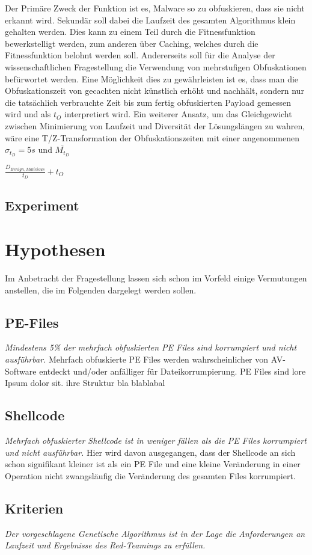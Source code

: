 Der Primäre Zweck der Funktion ist es, Malware so zu obfuskieren, dass sie nicht erkannt wird. Sekundär soll dabei die Laufzeit des gesamten Algorithmus klein gehalten werden. Dies kann zu einem Teil durch die Fitnessfunktion bewerkstelligt werden, zum anderen über Caching, welches durch die Fitnessfunktion belohnt werden soll. Andererseits soll für die Analyse der wissenschaftlichen Fragestellung die Verwendung von mehrstufigen Obfuskationen befürwortet werden. Eine Möglichkeit dies zu gewährleisten ist es, dass man die Obfuskationszeit von gecachten nicht künstlich erhöht und nachhält, sondern nur die tatsächlich verbrauchte Zeit bis zum fertig obfuskierten Payload gemessen wird und als $t_O$ interpretiert wird.
Ein weiterer Ansatz, um das Gleichgewicht zwischen Minimierung von Laufzeit und Diversität der Lösungslängen zu wahren, wäre eine T/Z-Transformation der Obfuskationszeiten mit einer angenommenen $\sigma _{t_D}=5s$ und $\overline{M_{t_D}}$

$\frac{D_{Benign, Malicious}}{t_D}+t_O$


\subsection{Experiment}
\section{Hypothesen}
Im Anbetracht der Fragestellung lassen sich schon im Vorfeld einige Vermutungen anstellen, die im Folgenden dargelegt werden sollen.
\subsection{PE-Files}
\textit{Mindestens 5\% der mehrfach obfuskierten PE Files sind korrumpiert und nicht ausführbar.}
Mehrfach obfuskierte PE Files werden wahrscheinlicher von AV-Software entdeckt und/oder anfälliger für Dateikorrumpierung.
PE Files sind lore Ipsum dolor sit. ihre Struktur bla blablabal
\subsection{Shellcode}
\textit{Mehrfach obfuskierter Shellcode ist in weniger fällen als die PE Files korrumpiert und nicht ausführbar.}
Hier wird davon ausgegangen, dass der Shellcode an sich schon signifikant kleiner ist als ein PE File und eine kleine Veränderung in einer Operation nicht zwangsläufig die Veränderung des gesamten Files korrumpiert.
\subsection{Kriterien}
\textit{Der vorgeschlagene Genetische Algorithmus ist in der Lage die Anforderungen an Laufzeit und Ergebnisse des Red-Teamings zu erfüllen.}
